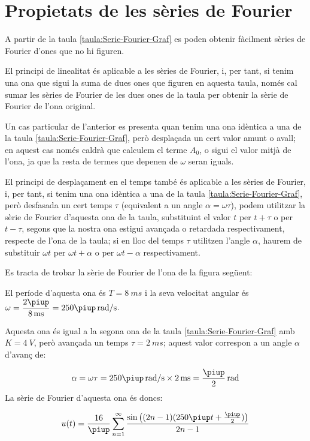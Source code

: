 \section{Propietats de les sèries de Fourier}

A partir de la taula \vref{taula:Serie-Fourier-Graf} es poden obtenir fàcilment sèries de Fourier d'ones que no hi figuren.

El principi de linealitat és aplicable a les sèries de Fourier, i, per tant, si tenim una ona que sigui la suma de dues ones que figuren en aquesta taula, només  cal sumar les sèries de Fourier de les dues ones de la taula per obtenir la sèrie de Fourier de l'ona original.

Un cas particular de l'anterior es presenta quan tenim una ona  idèntica a una de la taula \ref{taula:Serie-Fourier-Graf}, però desplaçada un cert valor amunt o avall; en aquest cas només caldrà que calculem el terme $A_0$, o sigui el valor mitjà de l'ona, ja que la resta de termes que depenen de $\omega$ seran iguals.

El principi de desplaçament en el temps també és aplicable a les sèries de Fourier, i, per tant, si tenim una ona idèntica a una de la taula \ref{taula:Serie-Fourier-Graf}, però desfasada un cert temps $\tau$ (equivalent a un angle $\alpha = \omega \tau$), podem utilitzar la sèrie de Fourier d'aquesta ona de la taula, substituint el valor $t$ per $t+\tau$ o per $t-\tau$, segons que la nostra ona estigui avançada o retardada respectivament, respecte de l'ona de la taula; si en lloc del temps $\tau$ utilitzen l'angle $\alpha$, haurem de substituir  $\omega t$ per $\omega t + \alpha$ o per $\omega t - \alpha$ respectivament.


\begin{exemple}[\SerieFouTaulaFormes{}]
	\addcontentsxms{\SerieFouTaulaFormes}
    Es tracta de trobar la sèrie de Fourier de l'ona de la figura següent:
    \begin{center}
        
    \end{center}

    El període d'aquesta ona és $T=\qty{8}{ms}$ i la seva velocitat angular és $\omega = \dfrac{2\piup}{\qty{8}{ms}} = 250 \piup\unit{\,rad/s}$.

    Aquesta ona és igual a la segona ona de la taula \vref{taula:Serie-Fourier-Graf} amb $K=\qty{4}{V}$, però avançada un temps $\tau=\qty{2}{ms}$; aquest valor correspon a un angle $\alpha$ d'avanç de:

    \[
        \alpha = \omega \tau = 250\piup\unit{\,rad/s} \times \qty{2}{ms} = \frac{\piup}{2}\unit{\,rad}
    \]
    La sèrie de Fourier d'aquesta ona és doncs:

    \[
    u(t) = \frac{{16}}{\piup }\sum\limits_{n = 1}^\infty  {\frac{{\sin \big((2n - 1)(250\piup t+ \frac{\piup}{2})\big)}}{{2n - 1}}}
    \]
\end{exemple}

